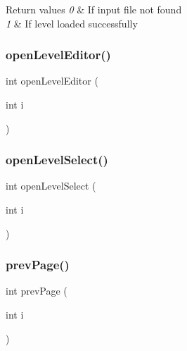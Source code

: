 \begin{DoxyRetVals}{Return values}
{\em 0} & If input file not found \\
\hline
{\em 1} & If level loaded successfully \\
\hline
\end{DoxyRetVals}
\mbox{\label{group___core_ga38f3d65c215c1ab12f47b8aa9dfe4cc5}} 
\subsubsection{\texorpdfstring{open\+Level\+Editor()}{openLevelEditor()}}
{\footnotesize\ttfamily int open\+Level\+Editor (\begin{DoxyParamCaption}\item[{int}]{i }\end{DoxyParamCaption})}

\mbox{\label{group___core_ga6851f8613954858f5ed67795db823076}} 
\subsubsection{\texorpdfstring{open\+Level\+Select()}{openLevelSelect()}}
{\footnotesize\ttfamily int open\+Level\+Select (\begin{DoxyParamCaption}\item[{int}]{i }\end{DoxyParamCaption})}

\mbox{\label{group___core_ga8f29a9074178aa050d1938014a4d9d5b}} 
\subsubsection{\texorpdfstring{prev\+Page()}{prevPage()}}
{\footnotesize\ttfamily int prev\+Page (\begin{DoxyParamCaption}\item[{int}]{i }\end{DoxyParamCaption})}

\mbox{\label{group___core_ga6270007e1f0c1a21e81dc3c5bdee14a6}} 
